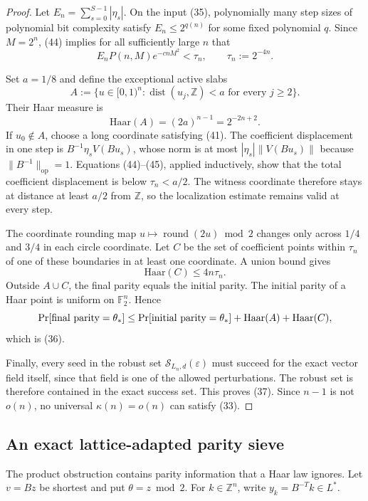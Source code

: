 \documentclass[10pt]{article}
\theoremstyle{definition}
\newcommand{\Z}{\mathbb{Z}}
\newcommand{\F}{\mathbb{F}}
\newcommand{\Prb}{\mathop{\rm Pr}}
\newcommand{\op}{\mathrm{op}}
\newcommand{\Haar}{\mathrm{Haar}}
\newcommand{\norm}[1]{\lVert #1\rVert}
\newcommand{\cS}{\mathcal{S}}
\begin{document}
\begin{proof}
Let $E_n=\sum_{s=0}^{S-1}|\eta_s|$.  On the input (35), polynomially many
step sizes of polynomial bit complexity satisfy
$E_n\le2^{q(n)}$ for some fixed polynomial $q$.  Since $M=2^n$, (44) implies
for all sufficiently large $n$ that
\[
 E_nP(n,M)e^{-cnM^2}<\tau_n,
 \qquad \tau_n:=2^{-4n}.                                       \tag{45}
\]

Set $a=1/8$ and define the exceptional active slabs
\[
 A:=\{u\in[0,1)^n:
       \operatorname{dist}(u_j,\Z)<a\text{ for every }j\ge2\}.
\]
Their Haar measure is
\[
 \Haar(A)=(2a)^{n-1}=2^{-2n+2}.                                 \tag{46}
\]
If $u_0\notin A$, choose a long coordinate satisfying (41).  The coefficient
displacement in one step is
$B^{-1}\eta_sV(Bu_s)$, whose norm is at most
$|\eta_s|\norm{V(Bu_s)}$ because $\norm{B^{-1}}_{\op}=1$.
Equations (44)--(45), applied inductively, show that the total coefficient
displacement is below $\tau_n<a/2$.  The witness coordinate therefore stays
at distance at least $a/2$ from $\Z$, so the localization estimate remains
valid at every step.

The coordinate rounding map $u\mapsto\operatorname{round}(2u)\bmod2$ changes
only across $1/4$ and $3/4$ in each circle coordinate.  Let $C$ be the set
of coefficient points within $\tau_n$ of one of these boundaries in at least
one coordinate.  A union bound gives
\[
 \Haar(C)\le4n\tau_n.                                           \tag{47}
\]
Outside $A\cup C$, the final parity equals the initial parity.  The initial
parity of a Haar point is uniform on $\F_2^n$.  Hence
\[
 \Prb[\text{final parity}=\theta_*]
 \le\Prb[\text{initial parity}=\theta_*]+\Haar(A)+\Haar(C),
\]
which is (36).

Finally, every seed in the robust set $\cS_{L_n,d}(\varepsilon)$ must
succeed for the exact vector field itself, since that field is one of the
allowed perturbations.  The robust set is therefore contained in the exact
success set.  This proves (37).  Since $n-1$ is not $o(n)$, no universal
$\kappa(n)=o(n)$ can satisfy (33).
\end{proof}

\subsection{An exact lattice-adapted parity sieve}

The product obstruction contains parity information that a Haar law ignores.
Let $v=Bz$ be shortest and put $\theta=z\bmod2$.  For
$k\in\Z^n$, write $y_k=B^{-T}k\in L^*$.
\end{document}
